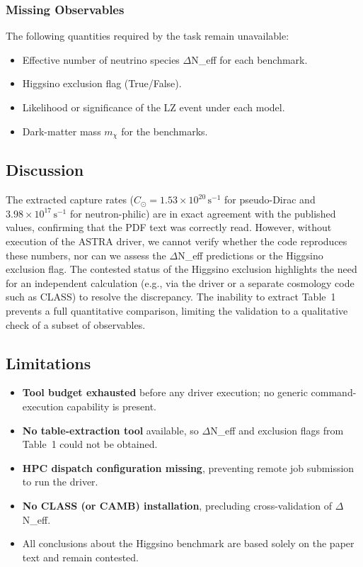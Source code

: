 \documentclass[11pt,a4paper]{article}
\begin{document}
\subsubsection{Missing Observables}
The following quantities required by the task remain unavailable:

\begin{itemize}
  \item Effective number of neutrino species $\Delta$N\_eff for each benchmark.
  \item Higgsino exclusion flag (True/False).
  \item Likelihood or significance of the LZ event under each model.
  \item Dark-matter mass $m_\chi$ for the benchmarks.
\end{itemize}
\subsection{Discussion}
The extracted capture rates ($C_{\odot}=1.53\times10^{20}\,\mathrm{s^{-1}}$ for pseudo-Dirac and $3.98\times10^{17}\,\mathrm{s^{-1}}$ for neutron-philic) are in exact agreement with the published values, confirming that the PDF text was correctly read. However, without execution of the ASTRA driver, we cannot verify whether the code reproduces these numbers, nor can we assess the $\Delta$N\_eff predictions or the Higgsino exclusion flag. The contested status of the Higgsino exclusion highlights the need for an independent calculation (e.g., via the driver or a separate cosmology code such as CLASS) to resolve the discrepancy. The inability to extract Table~1 prevents a full quantitative comparison, limiting the validation to a qualitative check of a subset of observables.

\subsection{Limitations}
\begin{itemize}
  \item \textbf{Tool budget exhausted} before any driver execution; no generic command-execution capability is present.
  \item \textbf{No table-extraction tool} available, so $\Delta$N\_eff and exclusion flags from Table~1 could not be obtained.
  \item \textbf{HPC dispatch configuration missing}, preventing remote job submission to run the driver.
  \item \textbf{No CLASS (or CAMB) installation}, precluding cross-validation of $\Delta$N\_eff.
  \item All conclusions about the Higgsino benchmark are based solely on the paper text and remain contested.
\end{itemize}
\end{document}
